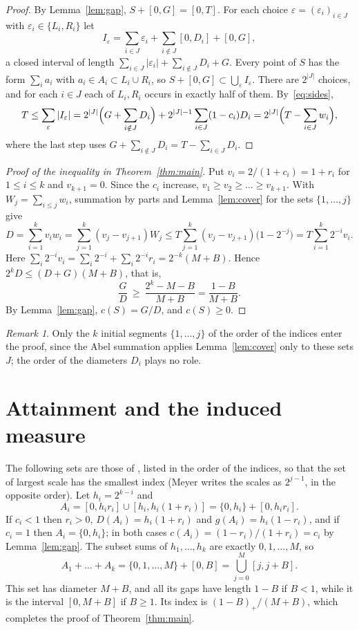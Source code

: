 \documentclass[11pt]{amsart}
\theoremstyle{remark}
\newtheorem{remark}[theorem]{Remark}
\begin{document}
\begin{proof}
By Lemma~\ref{lem:gap}, $S+[0,G]=[0,T]$. For each choice $\varepsilon=(\varepsilon_i)_{i\in J}$ with
$\varepsilon_i\in\{L_i,R_i\}$ let
\[
  I_\varepsilon=\sum_{i\in J}\varepsilon_i+\sum_{i\notin J}[0,D_i]+[0,G],
\]
a closed interval of length $\sum_{i\in J}|\varepsilon_i|+\sum_{i\notin J}D_i+G$. Every point of $S$ has the form
$\sum_ia_i$ with $a_i\in A_i\subset L_i\cup R_i$, so $S+[0,G]\subset\bigcup_\varepsilon I_\varepsilon$. There are
$2^{|J|}$ choices, and for each $i\in J$ each of $L_i,R_i$ occurs in exactly half of them. By~\eqref{eq:sides},
\[
  T\le\sum_\varepsilon|I_\varepsilon|
   =2^{|J|}\Bigl(G+\sum_{i\notin J}D_i\Bigr)+2^{|J|-1}\sum_{i\in J}(1-c_i)D_i
   =2^{|J|}\Bigl(T-\sum_{i\in J}w_i\Bigr),
\]
where the last step uses $G+\sum_{i\notin J}D_i=T-\sum_{i\in J}D_i$.
\end{proof}

\begin{proof}[Proof of the inequality in Theorem~\ref{thm:main}]
Put $v_i=2/(1+c_i)=1+r_i$ for $1\le i\le k$ and $v_{k+1}=0$. Since the $c_i$ increase, $v_1\ge v_2\ge\dots\ge
v_{k+1}$. With $W_j=\sum_{i\le j}w_i$, summation by parts and Lemma~\ref{lem:cover} for the sets $\{1,\dots,j\}$ give
\[
  D=\sum_{i=1}^kv_iw_i=\sum_{j=1}^k(v_j-v_{j+1})W_j
   \le T\sum_{j=1}^k(v_j-v_{j+1})\bigl(1-2^{-j}\bigr)
   =T\sum_{i=1}^k2^{-i}v_i .
\]
Here $\sum_i2^{-i}v_i=\sum_i2^{-i}+\sum_i2^{-i}r_i=2^{-k}(M+B)$. Hence $2^kD\le(D+G)(M+B)$, that is,
\[
  \frac GD\ \ge\ \frac{2^k-M-B}{M+B}=\frac{1-B}{M+B}.
\]
By Lemma~\ref{lem:gap}, $c(S)=G/D$, and $c(S)\ge0$.
\end{proof}

\begin{remark}
Only the $k$ initial segments $\{1,\dots,j\}$ of the order of the indices enter the proof, since the Abel summation
applies Lemma~\ref{lem:cover} only to these sets $J$; the order of the diameters $D_i$ plays no role.
\end{remark}

\section{Attainment and the induced measure}\label{sec:attain}

The following sets are those of \cite[Proposition~2.1]{MeyerArx}, listed in the order of the indices, so that the set of largest scale has
the smallest index (Meyer writes the scales as $2^{j-1}$, in the opposite order). Let
$h_i=2^{k-i}$ and
\[
  A_i=[0,h_ir_i]\cup[h_i,h_i(1+r_i)]=\{0,h_i\}+[0,h_ir_i].
\]
If $c_i<1$ then $r_i>0$, $D(A_i)=h_i(1+r_i)$ and $g(A_i)=h_i(1-r_i)$, and if $c_i=1$ then $A_i=\{0,h_i\}$; in both
cases $c(A_i)=(1-r_i)/(1+r_i)=c_i$ by Lemma~\ref{lem:gap}. The subset sums of $h_1,\dots,h_k$ are exactly
$0,1,\dots,M$, so
\[
  A_1+\dots+A_k=\{0,1,\dots,M\}+[0,B]=\bigcup_{j=0}^M[j,j+B].
\]
This set has diameter $M+B$, and all its gaps have length $1-B$ if $B<1$, while it is the interval $[0,M+B]$ if $B\ge1$.
Its index is $(1-B)_+/(M+B)$, which completes the proof of Theorem~\ref{thm:main}.
\end{document}

